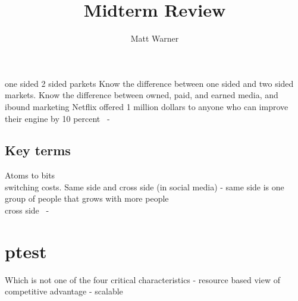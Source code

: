 \documentclass{report}
\title{\Huge{Midterm Review}}
\author{\huge{Matt Warner}}
\date{\huge{}}
\begin{document}
    \maketitle
one sided 2 sided parkets
Know the difference between one sided and two sided markets. 
\bigbreak \noindent
Know the difference between owned, paid, and earned media, and ibound marketing
\bigbreak \noindent
Netflix offered 1 million dollars to anyone who can improve their engine by 10 percent \ - \
\bigbreak \noindent
\subsection*{Key terms}
Atoms to bits \\
switching costs.
Same side and cross side (in social media) - same side is one group of people that grows with more people \\
cross side \ - \
\section{ptest}
Which is not one of the four critical characteristics - resource based view of competitive advantage - scalable
\end{document}
